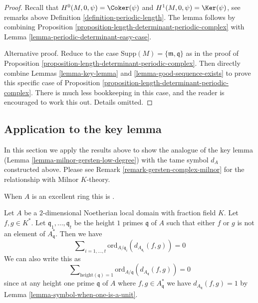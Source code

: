 \begin{proof}
Recall that $H^0(M, 0, \psi) = \Coker(\psi)$ and
$H^1(M, 0, \psi) = \Ker(\psi)$, see remarks above
Definition \ref{definition-periodic-length}.
The lemma follows by combining
Proposition \ref{proposition-length-determinant-periodic-complex} with
Lemma \ref{lemma-periodic-determinant-easy-case}.

\medskip\noindent
Alternative proof. Reduce to the case
$\text{Supp}(M) = \{\mathfrak m, \mathfrak q\}$
as in the proof of
Proposition \ref{proposition-length-determinant-periodic-complex}.
Then directly combine
Lemmas \ref{lemma-key-lemma} and
\ref{lemma-good-sequence-exists}
to prove this specific case of
Proposition \ref{proposition-length-determinant-periodic-complex}.
There is much less bookkeeping in this case, and the reader is
encouraged to work this out. Details omitted.
\end{proof}




\subsection{Application to the key lemma}
\label{subsection-application-tame-symbol}

\noindent
In this section we apply the results above to show the
analogue of the key lemma (Lemma \ref{lemma-milnor-gersten-low-degree})
with the tame symbol $d_A$ constructed above. Please
see Remark \ref{remark-gersten-complex-milnor}
for the relationship with Milnor $K$-theory.

\begin{lemma}
\label{lemma-secondary-ramification}
\begin{reference}
When $A$ is an excellent ring this is \cite[Proposition 1]{Kato-Milnor-K}.
\end{reference}
Let $A$ be a $2$-dimensional Noetherian local domain with fraction field $K$.
Let $f, g \in K^*$.
Let $\mathfrak q_1, \ldots, \mathfrak q_t$ be the height
$1$ primes $\mathfrak q$ of $A$ such that either $f$ or $g$ is not an
element of $A^*_{\mathfrak q}$.
Then we have
$$
\sum\nolimits_{i = 1, \ldots, t}
\text{ord}_{A/\mathfrak q_i}(d_{A_{\mathfrak q_i}}(f, g))
=
0
$$
We can also write this as
$$
\sum\nolimits_{\text{height}(\mathfrak q) = 1}
\text{ord}_{A/\mathfrak q}(d_{A_{\mathfrak q}}(f, g))
=
0
$$
since at any height one prime $\mathfrak q$
of $A$ where $f, g \in A^*_{\mathfrak q}$
we have $d_{A_{\mathfrak q}}(f, g) = 1$ by
Lemma \ref{lemma-symbol-when-one-is-a-unit}.
\end{lemma}

